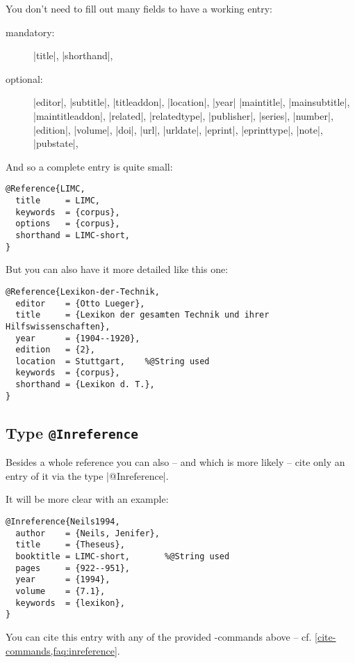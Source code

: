 \documentclass[a4paper,
10pt,
greek,
french,
spanish,
italian,
ngerman,
english
]{ltxdoc}
\begin{document}
You don’t need to fill out many fields to have a working entry:
\begin{description}
\item[mandatory:] |title|, |shorthand|,
\item[optional:] 
 |editor|, |subtitle|, |titleaddon|,
 |location|, |year|
|maintitle|, |mainsubtitle|, |maintitleaddon|,
|related|, |relatedtype|,
|publisher|, |series|, |number|, |edition|, |volume|,
|doi|, |url|, |urldate|, |eprint|, |eprinttype|, |note|, |pubstate|, 
\end{description}

And so a complete entry is quite small:
\begin{lstlisting}[style=bibentry,label=LIMC,caption={{@}Reference\{LIMC,…\} }]
@Reference{LIMC,
  title     = LIMC,
  keywords  = {corpus},
  options   = {corpus},
  shorthand = LIMC-short,
}
\end{lstlisting}
 
But you can also have it  more detailed  like this one:
\begin{lstlisting}[style=bibentry,label=Lexikon-der-Technik,caption={{@}Reference\{Lexikon-der-Technik,…\} }]
@Reference{Lexikon-der-Technik,
  editor    = {Otto Lueger},
  title     = {Lexikon der gesamten Technik und ihrer Hilfswissenschaften},
  year      = {1904--1920},
  edition   = {2},
  location  = Stuttgart, 	%@String used
  keywords  = {corpus},
  shorthand = {Lexikon d. T.},
}
\end{lstlisting}

 \subsection{Type \texttt{@Inreference}}\label{inreference}
Besides a whole reference you can also -- and which is more likely -- cite only an entry of it via the type  |@Inreference|.

It will be more clear with an example:
  \begin{lstlisting}[style=bibentry,label=Neils1994,caption={{@}Inreference\{Neils1994,…\} }]
@Inreference{Neils1994,
  author    = {Neils, Jenifer},
  title     = {Theseus},
  booktitle = LIMC-short,		%@String used
  pages     = {922--951},
  year      = {1994},
  volume    = {7.1},
  keywords  = {lexikon},
}
\end{lstlisting}
You can cite this entry with any of the provided -commands above -- cf. \cref{cite-commands,faq:inreference}.
\end{document}
